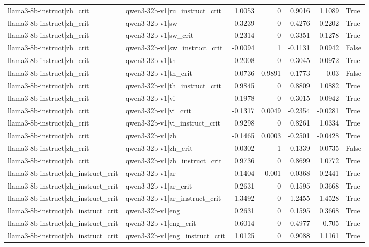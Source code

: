 \begin{table}
\begin{tabular}{l l r r r r l}
llama3-8b-instruct|zh_crit & qwen3-32b-v1|ru_instruct_crit & 1.0053 & 0 & 0.9016 & 1.1089 & True \\
llama3-8b-instruct|zh_crit & qwen3-32b-v1|sw & -0.3239 & 0 & -0.4276 & -0.2202 & True \\
llama3-8b-instruct|zh_crit & qwen3-32b-v1|sw_crit & -0.2314 & 0 & -0.3351 & -0.1278 & True \\
llama3-8b-instruct|zh_crit & qwen3-32b-v1|sw_instruct_crit & -0.0094 & 1 & -0.1131 & 0.0942 & False \\
llama3-8b-instruct|zh_crit & qwen3-32b-v1|th & -0.2008 & 0 & -0.3045 & -0.0972 & True \\
llama3-8b-instruct|zh_crit & qwen3-32b-v1|th_crit & -0.0736 & 0.9891 & -0.1773 & 0.03 & False \\
llama3-8b-instruct|zh_crit & qwen3-32b-v1|th_instruct_crit & 0.9845 & 0 & 0.8809 & 1.0882 & True \\
llama3-8b-instruct|zh_crit & qwen3-32b-v1|vi & -0.1978 & 0 & -0.3015 & -0.0942 & True \\
llama3-8b-instruct|zh_crit & qwen3-32b-v1|vi_crit & -0.1317 & 0.0049 & -0.2354 & -0.0281 & True \\
llama3-8b-instruct|zh_crit & qwen3-32b-v1|vi_instruct_crit & 0.9298 & 0 & 0.8261 & 1.0334 & True \\
llama3-8b-instruct|zh_crit & qwen3-32b-v1|zh & -0.1465 & 0.0003 & -0.2501 & -0.0428 & True \\
llama3-8b-instruct|zh_crit & qwen3-32b-v1|zh_crit & -0.0302 & 1 & -0.1339 & 0.0735 & False \\
llama3-8b-instruct|zh_crit & qwen3-32b-v1|zh_instruct_crit & 0.9736 & 0 & 0.8699 & 1.0772 & True \\
llama3-8b-instruct|zh_instruct_crit & qwen3-32b-v1|ar & 0.1404 & 0.001 & 0.0368 & 0.2441 & True \\
llama3-8b-instruct|zh_instruct_crit & qwen3-32b-v1|ar_crit & 0.2631 & 0 & 0.1595 & 0.3668 & True \\
llama3-8b-instruct|zh_instruct_crit & qwen3-32b-v1|ar_instruct_crit & 1.3492 & 0 & 1.2455 & 1.4528 & True \\
llama3-8b-instruct|zh_instruct_crit & qwen3-32b-v1|eng & 0.2631 & 0 & 0.1595 & 0.3668 & True \\
llama3-8b-instruct|zh_instruct_crit & qwen3-32b-v1|eng_crit & 0.6014 & 0 & 0.4977 & 0.705 & True \\
llama3-8b-instruct|zh_instruct_crit & qwen3-32b-v1|eng_instruct_crit & 1.0125 & 0 & 0.9088 & 1.1161 & True \\

\end{tabular}
\end{table}
